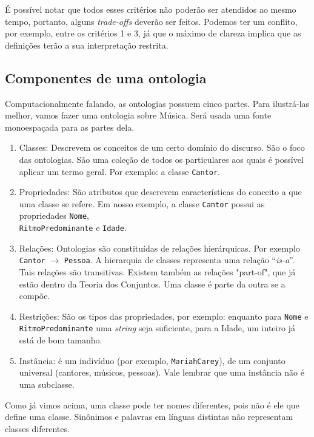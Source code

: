 É possível notar que todos esses critérios não poderão ser atendidos ao mesmo tempo, portanto, alguns \textit{trade-offs} deverão ser feitos.
Podemos ter um conflito, por exemplo, entre os critérios 1 e 3, já que o máximo de clareza implica que as definições terão a sua interpretação restrita.

\subsection{Componentes de uma ontologia}

Computacionalmente falando, as ontologias possuem cinco partes. Para ilustrá-las melhor, vamos fazer uma ontologia sobre Música. Será usada uma fonte monoespaçada para as partes dela.

\begin{enumerate}
	\item Classes: Descrevem os conceitos de um certo domínio do discurso. São o foco das ontologias. São uma coleção de todos os particulares aos quais é possível aplicar um termo geral. Por exemplo: a classe \texttt{Cantor}.
	\item Propriedades: São atributos que descrevem características do conceito a que uma classe se refere. Em nosso exemplo, a classe \texttt{Cantor} possui as propriedades \texttt{Nome}, \\ \texttt{RitmoPredominante} e \texttt{Idade}.
	\item Relações: Ontologias são constituídas de relações hierárquicas. Por exemplo \texttt{Cantor} $ \to $ \texttt{Pessoa}. A hierarquia de classes representa uma relação “\textit{is-a}”\cite{ontoFranca}. Tais relações são transitivas. Existem também as relações "part-of", que já estão dentro da Teoria dos Conjuntos. Uma classe é parte da outra se a compõe.
	\item Restrições: São os tipos das propriedades, por exemplo: enquanto para \texttt{Nome} e \\ \texttt{RitmoPredominante} uma \textit{string} seja suficiente, para a Idade, um inteiro já está de bom tamanho.
	\item Instância: é um indivíduo (por exemplo, \texttt{MariahCarey}), de um conjunto universal (cantores, músicos, pessoas). Vale lembrar que uma instância não é uma subclasse.
\end{enumerate}

Como já vimos acima, uma classe pode ter nomes diferentes, pois não é ele que define uma classe. Sinônimos e palavras em línguas distintas não representam classes diferentes.

